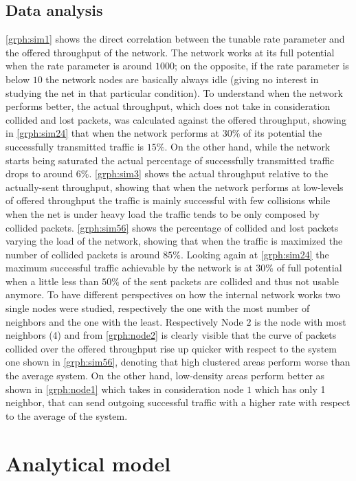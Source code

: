\documentclass[conference]{IEEEtran}
\begin{document}
\subsection{Data analysis}\label{sec:dataanalysis}
\cref{grph:sim1} shows the direct correlation between the tunable rate parameter and the offered throughput of the network. The network works at its full potential when the rate parameter is around \(1000\); on the opposite, if the rate parameter is below \(10\) the network nodes are basically always idle (giving no interest in studying the net in that particular condition). To understand when the network performs better, the actual throughput, which does not take in consideration collided and lost packets, was calculated against the offered throughput, showing in \cref{grph:sim24} that when the network performs at \(30\%\) of its potential the successfully transmitted traffic is \(15\%\). On the other hand, while the network starts being saturated the actual percentage of successfully transmitted traffic drops to around \(6\%\). \cref{grph:sim3} shows the actual throughput relative to the actually-sent throughput, showing that when the network performs at low-levels of offered throughput the traffic is mainly successful with few collisions while when the net is under heavy load the traffic tends to be only composed by collided packets. \cref{grph:sim56} shows the percentage of collided and lost packets varying the load of the network, showing that when the traffic is maximized the number of collided packets is around \(85\%\). Looking again at \cref{grph:sim24} the maximum successful traffic achievable by the network is at \(30\%\) of full potential when a little less than \(50\%\) of the sent packets are collided and thus not usable anymore. To have different perspectives on how the internal network works two single nodes were studied, respectively the one with the most number of neighbors and the one with the least. Respectively Node \(2\) is the node with most neighbors (4) and from \cref{grph:node2} is clearly visible that the curve of packets collided over the offered throughput rise up quicker with respect to the system one shown in \cref{grph:sim56}, denoting that high clustered areas perform worse than the average system. On the other hand, low-density areas perform better as shown in \cref{grph:node1} which takes in consideration node \(1\) which has only 1 neighbor, that can send outgoing successful traffic with a higher rate with respect to the average of the system.

\section{Analytical model}\label{sec:analiticalmodel}
\end{document}
